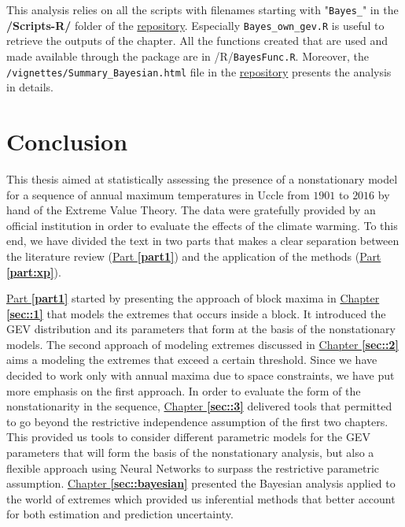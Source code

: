 \documentclass[11pt,a4paper,openany, twosided]{book}
\begin{document}
This analysis relies on all the scripts with filenames starting with "\texttt{Bayes\_}" in the \textbf{/Scripts-R/} folder of the \href{https://github.com/proto4426/PissoortThesis/}{repository}. Especially \texttt{Bayes\_own\_gev.R} is useful to retrieve the outputs of the chapter.  All the functions created that are used and made available through the package are in /R/\texttt{BayesFunc.R}. Moreover,
the \texttt{/vignettes/Summary\_Bayesian.html} file in the \href{https://github.com/proto4426/PissoortThesis/}{repository} presents the analysis in details.

\newpage





\chapter*{Conclusion}
\thispagestyle{empty}

This thesis aimed at statistically assessing the presence of a nonstationary model for a sequence of annual maximum temperatures in Uccle from $1901$ to $2016$ by hand of the Extreme Value Theory. The data were gratefully provided by an official institution in order to evaluate the effects of the climate warming.
To this end, we have divided the text in two parts that makes a clear separation between the literature review (\hyperref[part1]{Part \textbf{\ref{part1}}}) and the application of the methods (\hyperref[part:xp]{Part \textbf{\ref{part:xp}}}).

\hyperref[part1]{Part \textbf{\ref{part1}}} started by presenting the approach of block maxima in \hyperref[sec::1]{Chapter \textbf{\ref{sec::1}}} that models the extremes that occurs inside a block. It introduced the GEV distribution and its parameters that form at the basis of the nonstationary models.
The second approach of modeling extremes discussed in \hyperref[sec::2]{Chapter \textbf{\ref{sec::2}}} aims a modeling the extremes that exceed a certain threshold.
Since we have decided to work only with annual maxima due to space constraints, we have put more emphasis on the first approach. In order to evaluate the form of the nonstationarity in the sequence,
\hyperref[sec::3]{Chapter \textbf{\ref{sec::3}}} delivered tools that permitted to go beyond the restrictive independence assumption of the first two chapters. This provided us tools to consider different parametric models for the GEV parameters that will form the basis of the nonstationary analysis, but also a flexible approach using Neural Networks to surpass  the restrictive parametric assumption.
\hyperref[sec::bayesian]{Chapter \textbf{\ref{sec::bayesian}}} presented the Bayesian analysis applied to the world of extremes which provided us inferential methods that better account for both  estimation and prediction uncertainty. 
\end{document}
